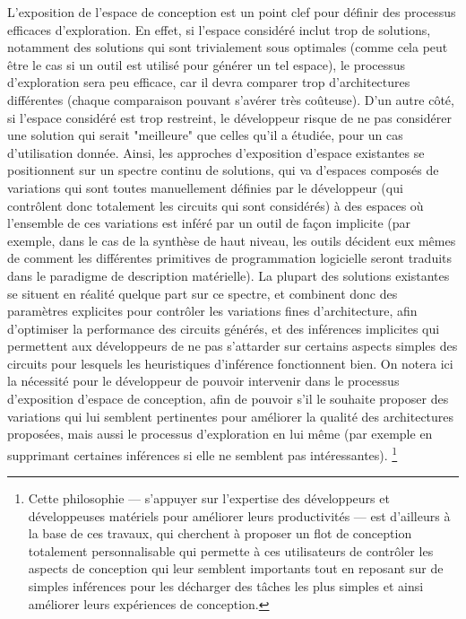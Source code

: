     L'exposition de l'espace de conception est un point clef pour définir des processus efficaces d'exploration.
    En effet, si l'espace considéré inclut trop de solutions, notamment des solutions qui sont trivialement sous optimales (comme cela peut être le cas si un outil est utilisé pour générer un tel espace), le processus d'exploration sera peu efficace, car il devra comparer trop d'architectures différentes (chaque comparaison pouvant s'avérer très coûteuse).
    D'un autre côté, si l'espace considéré est trop restreint, le développeur risque de ne pas considérer une solution qui serait "meilleure" que celles qu'il a étudiée, pour un cas d'utilisation donnée.
    Ainsi, les approches d'exposition d'espace existantes se positionnent sur un spectre continu de solutions, qui va d'espaces composés de variations qui sont toutes manuellement définies par le développeur (qui contrôlent donc totalement les circuits qui sont considérés) à des espaces où l'ensemble de ces variations est inféré par un outil de façon implicite (par exemple, dans le cas de la synthèse de haut niveau, les outils décident eux mêmes de comment les différentes primitives de programmation logicielle seront traduits dans le paradigme de description matérielle).
    La plupart des solutions existantes se situent en réalité quelque part sur ce spectre, et combinent donc des paramètres explicites pour contrôler les variations fines d'architecture, afin d'optimiser la performance des circuits générés, et des inférences implicites qui permettent aux développeurs de ne pas s'attarder sur certains aspects simples des circuits pour lesquels les heuristiques d'inférence fonctionnent bien.
    On notera ici la nécessité pour le développeur de pouvoir intervenir dans le processus d'exposition d'espace de conception, afin de pouvoir s'il le souhaite proposer des variations qui lui semblent pertinentes pour améliorer la qualité des architectures proposées, mais aussi le processus d'exploration en lui même (par exemple en supprimant certaines inférences si elle ne semblent pas intéressantes).%
    \footnote{Cette philosophie --- s'appuyer sur l'expertise des développeurs et développeuses matériels pour améliorer leurs productivités --- est d'ailleurs à la base de ces travaux, qui cherchent à proposer un flot de conception totalement personnalisable qui permette à ces utilisateurs de contrôler les aspects de conception qui leur semblent importants tout en reposant sur de simples inférences pour les décharger des tâches les plus simples et ainsi améliorer leurs expériences de conception.}

